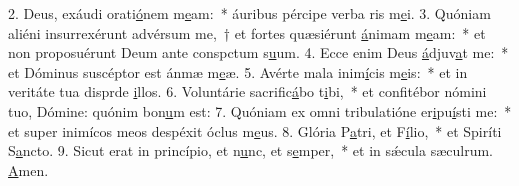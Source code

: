 2. Deus, exáudi orati\uline{ó}nem m\uline{e}am:~* áuribus pércipe verba ris m\uline{e}i.
3. Quóniam aliéni insurrexérunt advérsum me,~† et fortes quæsiérunt \uline{á}nimam m\uline{e}am:~* et non proposuérunt Deum ante conspctum s\uline{u}um.
4. Ecce enim Deus \uline{á}djuv\uline{a}t me:~* et Dóminus suscéptor est ánmæ m\uline{e}æ.
5. Avérte mala inim\uline{í}cis m\uline{e}is:~* et in veritáte tua disprde \uline{i}llos.
6. Voluntárie sacrific\uline{á}bo t\uline{i}bi,~* et confitébor nómini tuo, Dómine: quónim bon\uline{u}m est:
7. Quóniam ex omni tribulatióne er\uline{i}pu\uline{í}sti me:~* et super inimícos meos despéxit óclus m\uline{e}us.
8. Glória P\uline{a}tri, et F\uline{í}lio,~* et Spiríti S\uline{a}ncto.
9. Sicut erat in princípio, et n\uline{u}nc, et s\uline{e}mper,~* et in sǽcula sæculrum. \uline{A}men.
